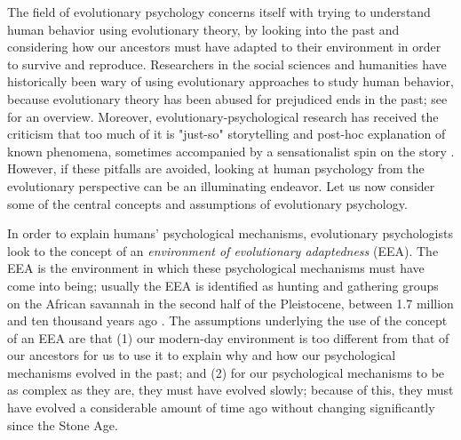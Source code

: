The field of evolutionary psychology concerns itself with trying to understand human behavior using evolutionary theory, by looking into the past and considering how our ancestors must have adapted to their environment in order to survive and reproduce.
Researchers in the social sciences and humanities have historically been wary of using evolutionary approaches to study human behavior, because evolutionary theory has been abused for prejudiced ends in the past; see \citet[pp.~19--20]{LB02} for an overview. Moreover, evolutionary-psychological research has received the criticism that too much of it is "just-so" storytelling and post-hoc explanation of known phenomena, sometimes accompanied by a sensationalist spin on the story \citep{LB02}.
However, if these pitfalls are avoided, looking at human psychology from the evolutionary perspective can be an illuminating endeavor.
Let us now consider some of the central concepts and assumptions of evolutionary psychology.

In order to explain humans' psychological mechanisms, evolutionary psychologists look to the concept of an \emph{environment of evolutionary adaptedness} (EEA). The EEA is the environment in which these psychological mechanisms must have come into being; usually the EEA is identified as hunting and gathering groups on the African savannah in the second half of the Pleistocene, between 1.7 million and ten thousand years ago \citep{LB02}.
The assumptions underlying the use of the concept of an EEA are that (1) our modern-day environment is too different from that of our ancestors for us to use it to explain why and how our psychological mechanisms evolved in the past; and (2) for our psychological mechanisms to be as complex as they are, they must have evolved slowly; because of this, they must have evolved a considerable amount of time ago without changing significantly since the Stone Age.

